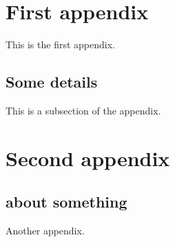 \section{First appendix}

This is the first appendix.

\lipsum[1]

\subsection{Some details}

This is a subsection of the appendix.

\lipsum[2]

\section{Second appendix}
\subsection{about something}

Another appendix.

\lipsum[3]